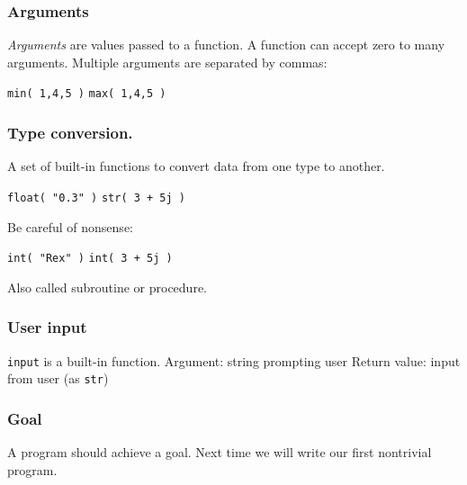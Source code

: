 \documentclass[11pt]{beamer}
\begin{document}
\begin{frame}
  \frametitle{Arguments}
  \Enlarge

  \begin{itemize}
  \myitem  \emph{Arguments} are values passed to a function. \pause
  \myitem  A function can accept zero to many arguments. \pause
  \myitem  Multiple arguments are separated by commas:
    \begin{itemize}
    \mysubitem  \texttt{min( 1,4,5 )}
    \mysubitem  \texttt{max( 1,4,5 )}
    \end{itemize}
  \end{itemize}
\end{frame}

\begin{frame}
  \frametitle{Type conversion.}
  \Enlarge

  \begin{itemize}
  \myitem  A set of built-in functions to convert data from one type to another. \pause
    \begin{itemize}
    \mysubitem  \texttt{float( "0.3" )}
    \mysubitem  \texttt{str( 3 + 5j )}
    \end{itemize} \pause
  \myitem  Be careful of nonsense:
    \begin{itemize}
    \mysubitem  \texttt{int( "Rex" )}
    \mysubitem  \texttt{int( 3 + 5j )}
    \end{itemize}
  \myitem  Also called subroutine or procedure.
  \end{itemize}
\end{frame}

\begin{frame}
  \frametitle{User input}
  \Enlarge

  \begin{itemize}
  \myitem  \texttt{input} is a built-in function. \pause
  \myitem  Argument:  string prompting user \pause
  \myitem  Return value:  input from user (as \texttt{str})
  \end{itemize}
\end{frame}

\begin{frame}
  \frametitle{Goal}
  \Enlarge

  \begin{itemize}
  \myitem  A program should achieve a goal. \pause
  \myitem  Next time we will write our first nontrivial program.
  \end{itemize}
\end{frame}
\end{document}
